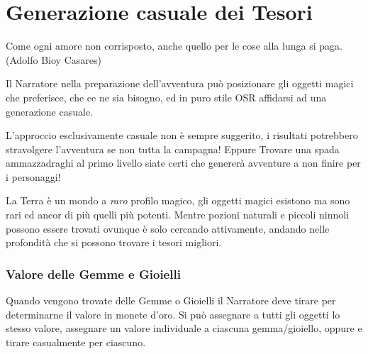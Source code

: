 \section{Generazione casuale dei Tesori}\label{generazionetesorimagici}\hypertarget{generazionetesorimagici}{}

\begin{enfasi}
{Come ogni amore non corrisposto, anche quello per le cose alla lunga si paga. (Adolfo Bioy Casares)}
\end{enfasi}

\begin{multicols}{2}

Il Narratore nella preparazione dell'avventura può posizionare gli oggetti magici che preferisce, che ce ne sia bisogno, ed in puro stile OSR affidarsi ad una generazione casuale.

L'approccio esclusivamente casuale non è sempre suggerito, i risultati potrebbero stravolgere l'avventura se non tutta la campagna!
Eppure Trovare una spada ammazzadraghi al primo livello siate certi che genererà avventure a non finire per i personaggi!

\begin{giocatore}[Tessssori!]
La Terra è un mondo a \emph{raro} profilo magico, gli oggetti magici esistono ma sono rari ed ancor di più quelli più potenti. Mentre pozioni naturali e piccoli ninnoli possono essere trovati ovunque è solo cercando attivamente, andando nelle profondità che si possono trovare i tesori migliori.
\end{giocatore}

\subsubsection{Valore delle Gemme e Gioielli}\hypertarget{valoredellegemme}{}\label{valoredellegemme}\hypertarget{valoredeigioielli}{}\label{valoredeigioielli}

Quando vengono trovate delle Gemme o Gioielli il Narratore deve tirare per determinarne il valore in monete d'oro. Si può assegnare a tutti gli oggetti lo stesso valore, assegnare un valore individuale a ciascuna gemma/gioiello, oppure e tirare casualmente per ciascuno.

\medskip

\end{multicols}
